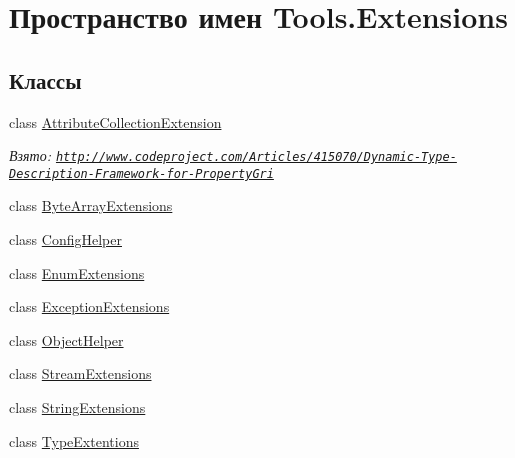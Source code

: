 \hypertarget{namespace_tools_1_1_extensions}{}\section{Пространство имен Tools.\+Extensions}
\label{namespace_tools_1_1_extensions}
\subsection*{Классы}
\begin{DoxyCompactItemize}
\item 
class \hyperlink{class_tools_1_1_extensions_1_1_attribute_collection_extension}{Attribute\+Collection\+Extension}
\begin{DoxyCompactList}\small\item\em Взято\+: \href{http://www.codeproject.com/Articles/415070/Dynamic-Type-Description-Framework-for-PropertyGri}{\tt http\+://www.\+codeproject.\+com/\+Articles/415070/\+Dynamic-\/\+Type-\/\+Description-\/\+Framework-\/for-\/\+Property\+Gri} \end{DoxyCompactList}\item 
class \hyperlink{class_tools_1_1_extensions_1_1_byte_array_extensions}{Byte\+Array\+Extensions}
\item 
class \hyperlink{class_tools_1_1_extensions_1_1_config_helper}{Config\+Helper}
\item 
class \hyperlink{class_tools_1_1_extensions_1_1_enum_extensions}{Enum\+Extensions}
\item 
class \hyperlink{class_tools_1_1_extensions_1_1_exception_extensions}{Exception\+Extensions}
\item 
class \hyperlink{class_tools_1_1_extensions_1_1_object_helper}{Object\+Helper}
\item 
class \hyperlink{class_tools_1_1_extensions_1_1_stream_extensions}{Stream\+Extensions}
\item 
class \hyperlink{class_tools_1_1_extensions_1_1_string_extensions}{String\+Extensions}
\item 
class \hyperlink{class_tools_1_1_extensions_1_1_type_extentions}{Type\+Extentions}
\end{DoxyCompactItemize}
